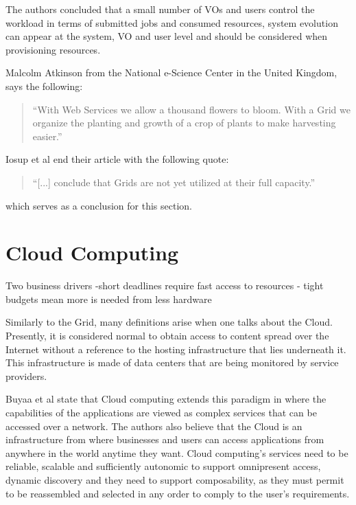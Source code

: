 The authors concluded that a small number of VOs and users control the workload in terms of submitted jobs and consumed resources, system evolution can appear at the system, VO and user level and should be considered when provisioning resources.\cite{iosup}

Malcolm Atkinson from the National e-Science Center in the United Kingdom, says the following:
\begin{quote}
``With Web Services we allow a thousand flowers to bloom. With a Grid we organize the planting and growth of a crop of plants to make harvesting easier.''\cite{stockinger}
\end{quote}

Iosup et al end their article with the following quote:

\begin{quote}
``[...] conclude that Grids are not yet utilized at their full capacity.''\cite{iosup}
\end{quote}

which serves as a conclusion for this section.



\section{Cloud Computing} \label{sec:cloud}

Two business drivers -short deadlines require fast access to resources
			- tight budgets mean more is needed from less hardware

Similarly to the Grid, many definitions arise when one talks about the Cloud. Presently, it is considered normal to obtain access to content spread over the Internet without a reference to the hosting infrastructure that lies underneath it. This infrastructure is made of data centers that are being monitored by service providers. 

Buyaa et al state that Cloud computing extends this paradigm in where the capabilities of the applications are viewed as complex services that can be accessed over a network. The authors also believe that the Cloud is an infrastructure from where businesses and users can access applications from anywhere in the world anytime they want. Cloud computing's services need to be reliable, scalable and sufficiently autonomic to support omnipresent access, dynamic discovery and they need to support composability, as they must permit to be reassembled and selected in any order to comply to the user's requirements.

